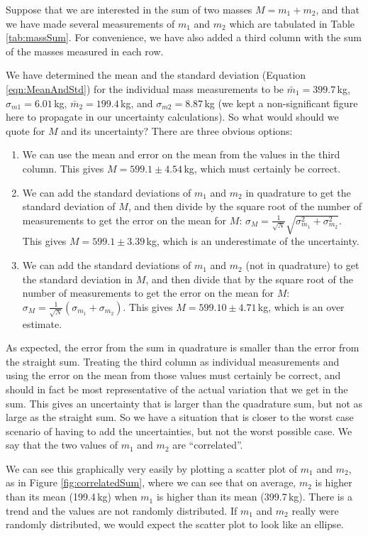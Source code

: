 Suppose that we are interested in the sum of two masses $M=m_1+m_2$, and that we have made several measurements of $m_1$ and $m_2$ which are tabulated in Table \ref{tab:massSum}. For convenience, we have also added a third column with the sum of the masses measured in each row.


We have determined the mean and the standard deviation (Equation \ref{eqn:MeanAndStd}) for the individual mass measurements to be $\bar m_1 = 399.7$\,kg, $ \sigma_{m1} = 6.01$\,kg, $\bar m_2=199.4$\,kg, and $\sigma_{m2} =  8.87$\,kg (we kept a non-significant figure here to propagate in our uncertainty calculations). So what would should we quote for $M$ and its uncertainty? There are three obvious options:
\begin{enumerate}
\item We can use the mean and error on the mean from the values in the third column. This gives $M=599.1 \pm 4.54$\,kg, which must certainly be correct.
\item We can add the standard deviations of $m_1$ and $m_2$ in quadrature to get the standard deviation of $M$, and then divide by the square root of the number of measurements to get the error on the mean for $M$: $\sigma_M=\frac{1}{\sqrt{N}}\sqrt{\sigma_{m_1}^2+\sigma_{m_2}^2}$. This gives $M= 599.1 \pm 3.39$\,kg, which is an underestimate of the uncertainty.
\item We can add the standard deviations of $m_1$ and $m_2$ (not in quadrature) to get the standard deviation in $M$, and then divide that by the square root of the number of measurements to get the error on the mean for $M$: $\sigma_M=\frac{1}{\sqrt{N}}(\sigma_{m_1}+\sigma_{m_2})$. This gives $M= 599.10 \pm 4.71$\,kg, which is an over estimate.
\end{enumerate}

As expected, the error from the sum in quadrature is smaller than the error from the straight sum. Treating the third column as individual measurements and using the error on the mean from those values must certainly be correct, and should in fact be most representative of the actual variation that we get in the sum. This gives an uncertainty that is larger than the quadrature sum, but not as large as the straight sum. So we have a situation that is closer to the worst case scenario of having to add the uncertainties, but not the worst possible case. We say that the two values of $m_1$ and $m_2$ are ``correlated''. 

We can see this graphically very easily by plotting a scatter plot of $m_1$ and $m_2$, as in Figure \ref{fig:correlatedSum}, where we can see that on average, $m_2$ is higher than its mean (199.4\,kg) when $m_1$ is higher than its mean (399.7\,kg). There is a trend and the values are not randomly distributed. If $m_1$ and $m_2$ really were randomly distributed, we would expect the scatter plot to look like an ellipse. 

